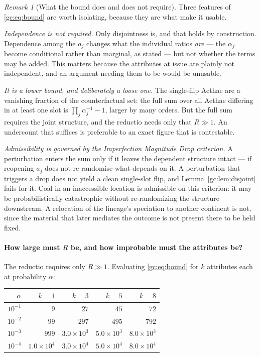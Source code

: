 \documentclass[11pt]{article}
\numberwithin{equation}{section}
\theoremstyle{plain}
\theoremstyle{definition}
\theoremstyle{remark}
\newtheorem{remark}[theorem]{Remark}
\begin{document}
\begin{remark}[What the bound does and does not require]
\label{gc:rem:boundrequires}
Three features of \eqref{gc:eq:bound} are worth isolating, because they
are what make it usable.

\emph{Independence is not required.} Only disjointness is, and that
holds by construction. Dependence among the $a_j$ changes what the
individual ratios \emph{are} --- the $\alpha_j$ become conditional
rather than marginal, as stated --- but not whether the terms may be
added. This matters because the attributes at issue are plainly not
independent, and an argument needing them to be would be unusable.

\emph{It is a lower bound, and deliberately a loose one.} The
single-flip Aethae are a vanishing fraction of the counterfactual set:
the full sum over all Aethae differing in at least one slot is
$\prod_j\alpha_j^{-1}-1$, larger by many orders. But the full sum
requires the joint structure, and the reductio needs only that $R\gg1$.
An undercount that suffices is preferable to an exact figure that is
contestable.

\emph{Admissibility is governed by the Imperfection Magnitude Drop
criterion.} A perturbation enters the sum only if it leaves the
dependent structure intact --- if reopening $a_j$ does not re-randomise
what depends on it. A perturbation that triggers a drop does not yield a
clean single-slot flip, and Lemma~\ref{gc:lem:disjoint} fails for it.
Coal in an inaccessible location is admissible on this criterion: it may
be probabilistically catastrophic without re-randomizing the structure
downstream. A relocation of the lineage's speciation to another
continent is not, since the material that later mediates the outcome is
not present there to be held fixed.
\end{remark}

\paragraph{How large must $R$ be, and how improbable must the
attributes be?} The reductio requires only $R\gg1$. Evaluating
\eqref{gc:eq:bound} for $k$ attributes each at probability $\alpha$:

\begin{center}\small
\begin{tabular}{@{}rrrrr@{}}
\toprule
$\alpha$ & $k=1$ & $k=3$ & $k=5$ & $k=8$\\
\midrule
$10^{-1}$ & $9$ & $27$ & $45$ & $72$\\
$10^{-2}$ & $99$ & $297$ & $495$ & $792$\\
$10^{-3}$ & $999$ & $3.0\times10^{3}$ & $5.0\times10^{3}$ & $8.0\times10^{3}$\\
$10^{-4}$ & $1.0\times10^{4}$ & $3.0\times10^{4}$ & $5.0\times10^{4}$ & $8.0\times10^{4}$\\
\bottomrule
\end{tabular}
\end{center}
\end{document}
